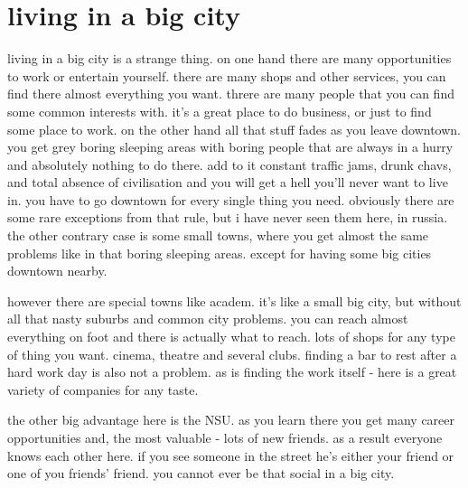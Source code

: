 \documentclass[russian]{article}
\begin{document}
\section{living in a big city}

living in a big city is a strange thing. %
on one hand there are many opportunities to work or entertain yourself. %
there are many shops and other services, you can find there almost everything you want. %
threre are many people that you can find some common interests with. %
it's a great place to do business, or just to find some place to work. %
on the other hand all that stuff fades as you leave downtown. %
you get grey boring sleeping areas with boring people that are always in a hurry and absolutely nothing to do there. %
add to it constant traffic jams, drunk chavs, and total absence of civilisation and you will get a hell you'll never want to live in. %
you have to go downtown for every single thing you need. %
obviously there are some rare exceptions from that rule, but i have never seen them here, in russia. %
the other contrary case is some small towns, where you get almost the same problems like in that boring sleeping areas. %
except for having some big cities downtown nearby. %

however there are special towns like academ. %
it's like a small big city, but without all that nasty suburbs and common city problems. %
you can reach almost everything on foot and there is actually what to reach. %
lots of shops for any type of thing you want. %
cinema, theatre and several clubs. %
finding a bar to rest after a hard work day is also not a problem. %
as is finding the work itself - here is a great variety of companies for any taste. %


the other big advantage here is the NSU. %
as you learn there you get many career opportunities and, the most valuable - lots of new friends. %
as a result everyone knows each other here. %
if you see someone in the street he's either your friend or one of you friends' friend. %
you cannot ever be that social in a big city. %

\end{document}

